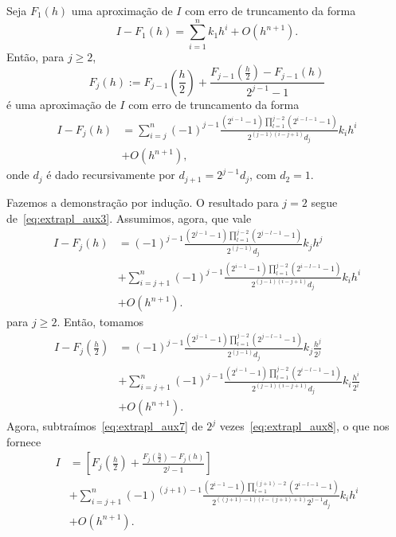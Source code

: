 \begin{teo}\label{teo:Richardson}
  Seja $F_1(h)$ uma aproximação de $I$ com erro de truncamento da forma
  \begin{equation}
    I-F_1(h) = \sum_{i=1}^n k_1h^i + O(h^{n+1}).
  \end{equation}
Então, para $j\geq 2$,
\begin{equation}
  F_j(h) := F_{j-1}\left(\frac{h}{2}\right) + \frac{F_{j-1}\left(\frac{h}{2}\right) - F_{j-1}(h)}{2^{j-1}-1}
\end{equation}
é uma aproximação de $I$ com erro de truncamento da forma
\begin{align}
  I-F_{j}(h) &= \sum_{i=j}^n (-1)^{j-1}\frac{\left(2^{i-1}-1\right)\prod_{l=1}^{j-2}\left(2^{i-l-1}-1\right)}{2^{(j-1)(i-j+1)}d_j}k_ih^i \nonumber \\
           & + O(h^{n+1}),
\end{align}
onde $d_{j}$ é dado recursivamente por $d_{j+1}=2^{j-1}d_j$, com $d_2=1$.
\end{teo}
\begin{dem}
  Fazemos a demonstração por indução. O resultado para $j=2$ segue de~\eqref{eq:extrapl_aux3}. Assumimos, agora, que vale
  \begin{align}
    I-F_{j}(h) &= (-1)^{j-1}\frac{\left(2^{j-1}-1\right)\prod_{l=1}^{j-2}\left(2^{j-l-1}-1\right)}{2^{(j-1)}d_j}k_jh^j \nonumber \\
              &+ \sum_{i=j+1}^n (-1)^{j-1}\frac{\left(2^{i-1}-1\right)\prod_{l=1}^{j-2}\left(2^{i-l-1}-1\right)}{2^{(j-1)(i-j+1)}d_j}k_ih^i \nonumber \\
              & + O(h^{n+1}).\label{eq:extrapl_aux7}
  \end{align}
para $j\geq 2$. Então, tomamos
\begin{align}
  I-F_{j}\left(\frac{h}{2}\right) &= (-1)^{j-1}\frac{\left(2^{j-1}-1\right)\prod_{l=1}^{j-2}\left(2^{j-l-1}-1\right)}{2^{(j-1)}d_j}k_j\frac{h^j}{2^j} \nonumber \\
              &+ \sum_{i=j+1}^n (-1)^{j-1}\frac{\left(2^{i-1}-1\right)\prod_{l=1}^{j-2}\left(2^{i-l-1}-1\right)}{2^{(j-1)(i-j+1)}d_j}k_i\frac{h^i}{2^i} \nonumber \\
              & + O(h^{n+1}). \label{eq:extrapl_aux8}
\end{align}
Agora, subtraímos~\eqref{eq:extrapl_aux7} de $2^{j}$ vezes~\eqref{eq:extrapl_aux8}, o que nos fornece
\begin{align}
  I &= \left[F_{j}\left(\frac{h}{2}\right) + \frac{F_{j}\left(\frac{h}{2}\right) - F_{j}(h)}{2^{j}-1}\right] \nonumber\\
    &+ \sum_{i=j+1}^n (-1)^{(j+1)-1}\frac{\left(2^{i-1}-1\right)\prod_{l=1}^{(j+1)-2}\left(2^{i-l-1}-1\right)}{2^{((j+1)-1)(i-(j+1)+1)}2^{j-1}d_j}k_ih^i\nonumber \\
              & + O(h^{n+1}).
\end{align}
\end{dem}

